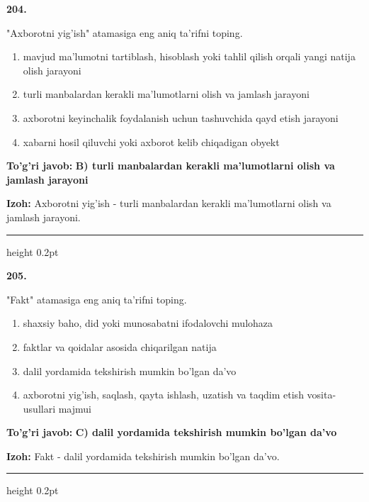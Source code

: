 \documentclass[10pt,a4paper,oneside]{article}
\begin{document}
\noindent\textbf{\color{ink}204.}
\par
"Axborotni yig'ish" atamasiga eng aniq ta'rifni toping.
\begin{enumerate}[label=\Alph*),leftmargin=9mm]
\item mavjud ma'lumotni tartiblash, hisoblash yoki tahlil qilish orqali yangi natija olish jarayoni
\item turli manbalardan kerakli ma'lumotlarni olish va jamlash jarayoni
\item axborotni keyinchalik foydalanish uchun tashuvchida qayd etish jarayoni
\item xabarni hosil qiluvchi yoki axborot kelib chiqadigan obyekt
\end{enumerate}
\begin{tcolorbox}[enhanced,breakable,colback=teal!4,colframe=teal!50!black,boxrule=0.5pt,arc=1.1mm,left=3mm,right=3mm,top=1.7mm,bottom=1.7mm,before skip=2mm,after skip=2mm]
\textbf{\color{teal}To'g'ri javob:} \textbf{B) turli manbalardan kerakli ma'lumotlarni olish va jamlash jarayoni}
\par\smallskip
\textbf{Izoh:} Axborotni yig'ish - turli manbalardan kerakli ma'lumotlarni olish va jamlash jarayoni.
\end{tcolorbox}
\vspace{2mm}\hrule height 0.2pt \vspace{3mm}

\noindent\textbf{\color{ink}205.}
\par
"Fakt" atamasiga eng aniq ta'rifni toping.
\begin{enumerate}[label=\Alph*),leftmargin=9mm]
\item shaxsiy baho, did yoki munosabatni ifodalovchi mulohaza
\item faktlar va qoidalar asosida chiqarilgan natija
\item dalil yordamida tekshirish mumkin bo'lgan da'vo
\item axborotni yig'ish, saqlash, qayta ishlash, uzatish va taqdim etish vosita-usullari majmui
\end{enumerate}
\begin{tcolorbox}[enhanced,breakable,colback=teal!4,colframe=teal!50!black,boxrule=0.5pt,arc=1.1mm,left=3mm,right=3mm,top=1.7mm,bottom=1.7mm,before skip=2mm,after skip=2mm]
\textbf{\color{teal}To'g'ri javob:} \textbf{C) dalil yordamida tekshirish mumkin bo'lgan da'vo}
\par\smallskip
\textbf{Izoh:} Fakt - dalil yordamida tekshirish mumkin bo'lgan da'vo.
\end{tcolorbox}
\vspace{2mm}\hrule height 0.2pt \vspace{3mm}
\end{document}
